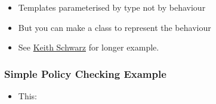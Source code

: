 \begin{itemize}
\itemsep1pt\parskip0pt
\item
  Templates parameterised by type not by behaviour
\item
  But you can make a class to represent the behaviour
\item
  See
  \href{http://www.keithschwarz.com/talks/slides/tmp-cs242.pdf}{Keith
  Schwarz} for longer example.
\end{itemize}

\subsubsection{Simple Policy Checking
Example}\label{simple-policy-checking-example}

\begin{itemize}
\itemsep1pt\parskip0pt
\item
  This:
\end{itemize}

